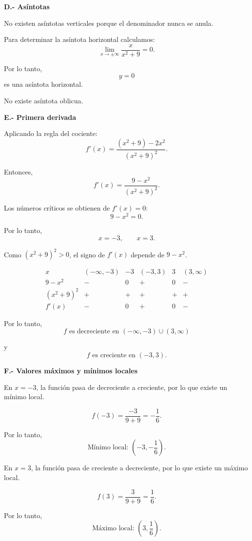 \documentclass[12pt]{article}
\begin{document}
\begin{enumerate}[label=\alph*.-]
    \textbf{D.- Asíntotas}

    No existen asíntotas verticales porque el denominador nunca se anula.

    Para determinar la asíntota horizontal calculamos:
    \[
    \lim_{x\to\pm\infty}\frac{x}{x^2+9}=0.
    \]

    Por lo tanto,
    \[
    \boxed{y=0}
    \]
    es una asíntota horizontal.

    No existe asíntota oblicua.

    \textbf{E.- Primera derivada}

    Aplicando la regla del cociente:
    \[
    f'(x)
    =
    \frac{(x^2+9)-2x^2}{(x^2+9)^2}.
    \]

    Entonces,
    \[
    f'(x)=\frac{9-x^2}{(x^2+9)^2}.
    \]

    Los números críticos se obtienen de $f'(x)=0$:
    \[
    9-x^2=0.
    \]

    Por lo tanto,
    \[
    x=-3,\qquad x=3.
    \]

    Como $(x^2+9)^2>0$, el signo de $f'(x)$ depende de $9-x^2$.

    \[
    \begin{array}{c|ccccc}
    x & (-\infty,-3) & -3 & (-3,3) & 3 & (3,\infty)\\
    \hline
    9-x^2 & - & 0 & + & 0 & -\\
    (x^2+9)^2 & + & + & + & + & +\\
    \hline
    f'(x) & - & 0 & + & 0 & -
    \end{array}
    \]

    Por lo tanto,
    \[
    \boxed{
    f\text{ es decreciente en }(-\infty,-3)\cup(3,\infty)
    }
    \]

    y
    \[
    \boxed{
    f\text{ es creciente en }(-3,3).
    }
    \]

    \textbf{F.- Valores máximos y mínimos locales}

    En $x=-3$, la función pasa de decreciente a creciente, por lo que
    existe un mínimo local.

    \[
    f(-3)=\frac{-3}{9+9}=-\frac16.
    \]

    Por lo tanto,
    \[
    \boxed{
    \text{Mínimo local: }\left(-3,-\frac16\right)
    }.
    \]

    En $x=3$, la función pasa de creciente a decreciente, por lo que
    existe un máximo local.

    \[
    f(3)=\frac{3}{9+9}=\frac16.
    \]

    Por lo tanto,
    \[
    \boxed{
    \text{Máximo local: }\left(3,\frac16\right)
    }.
    \]


\end{enumerate}
\end{document}
